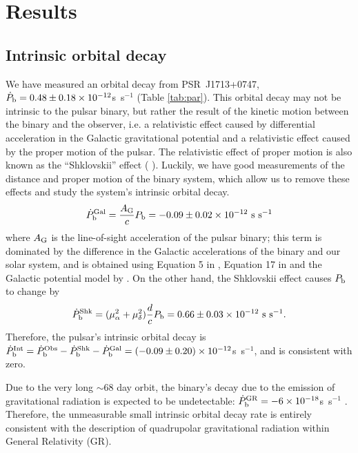 \section{Results}
\label{sec:res}

\subsection{Intrinsic orbital decay}
\label{sec:obdecay}
We have measured an orbital decay from PSR~J1713+0747, $\dot{P}_{\rm b} =
0.48\pm0.18\times10^{-12}$s~s$^{-1}$ (Table \ref{tab:par}).
This orbital decay may not be intrinsic to the pulsar binary, but rather the
result of the kinetic motion between the binary and the
observer, i.e. a relativistic effect caused by differential 
acceleration in the Galactic gravitational potential
\citep{dt91} and a relativistic effect caused by the proper motion of the
pulsar. The relativistic effect
of proper motion is also known as the ``Shklovskii'' effect (
\citealt{shk70}). Luckily, we have good measurements of the distance and proper
motion of the binary system, which allow us to remove these effects and study the system's intrinsic orbital decay.
\begin{equation}
\dot{P}_{\rm b}^{\rm Gal} = \frac{A_{\rm G}}{c} P_{\rm b} =
-0.09\pm0.02\times10^{-12}~{\rm s~s^{-1}}
\end{equation}
where $A_{\rm G}$ is the line-of-sight acceleration of the pulsar binary;
this term is dominated by the difference in the Galactic accelerations of the
binary and our solar system, and is obtained using
Equation 5 in \citet{nt95}, Equation 17 in \citet{lwj+09} and the Galactic
potential model by \citet{hf04a}.
On the other hand, the Shklovskii effect causes $P_{\rm b}$ to
change by
\begin{equation}
\dot{P}_{\rm b}^{\rm Shk} = (\mu_{\alpha}^2+\mu_{\delta}^2)\frac{d}{c}P_{\rm
b} = 0.66\pm0.03\times10^{-12}~{\rm s~s^{-1}}.
\end{equation}
Therefore, the pulsar's intrinsic orbital decay is $\dot{P}_{\rm b}^{\rm Int}
= \dot{P}_{\rm b}^{\rm Obs} - \dot{P}_{\rm b}^{\rm Shk} - \dot{P}_{\rm b}^{\rm
Gal} = (-0.09\pm0.20)\times10^{-12}$s~s$^{-1}$, and is consistent with zero.

Due to the very long $\sim$68 day orbit, the binary's decay due to the
emission of gravitational
radiation is expected to be undetectable: $\dot{P}_{\rm b}^{\rm GR} =
-6\times10^{-18}$s~s$^{-1}$ \citep{lk05}.  Therefore, the unmeasurable small 
intrinsic orbital decay rate is entirely consistent with the
description of quadrupolar gravitational radiation within General
Relativity (GR).

